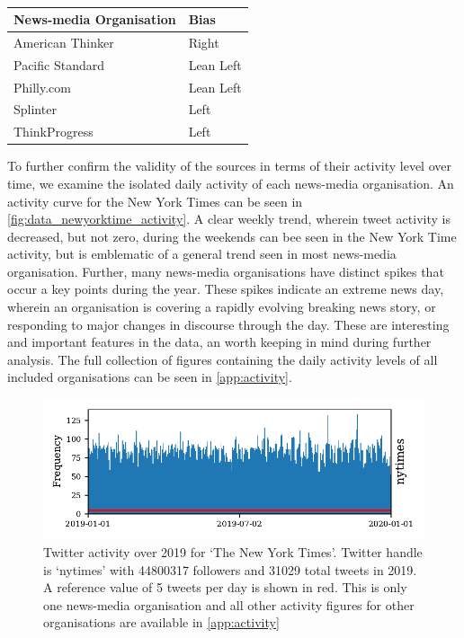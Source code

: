 \begin{table}
	\begin{tabular}{ll}
		\toprule
		News-media Organisation &    Bias \\
		\midrule
		American Thinker  &      Right \\
		Pacific Standard &  Lean Left \\
		Philly.com  &  Lean Left \\
		Splinter &       Left \\
		ThinkProgress  &       Left \\
		\bottomrule
	\end{tabular}
	\caption{\todo{}}
	\label{tab:data_removed_inactive_period}
\end{table}


To further confirm the validity of the sources in terms of their activity level over time, we examine the isolated daily activity of each news-media organisation. An activity curve for the New York Times can be seen in \autoref{fig:data_newyorktime_activity}. 
A clear weekly trend, wherein tweet activity is decreased, but not zero, during the weekends can bee seen in the New York Time activity, but is emblematic of a general trend seen in most news-media organisation. Further, many news-media organisations have distinct spikes that occur a key points during the year. These spikes indicate an extreme news day, wherein an organisation is covering a rapidly evolving breaking news story, or responding to major changes in discourse through the day. These are interesting and important features in the data, an worth keeping in mind during further analysis. The full collection of figures containing the daily activity levels of all included organisations can be seen in \autoref{app:activity}.

\begin{figure}
\centering
	\includegraphics{appendix2/figs/tweet_times/nytimes.pdf}
	\caption{Twitter activity over 2019 for `The New York Times'.
		Twitter handle is `nytimes' with 44800317 followers and 31029 total tweets in 2019. A reference value of 5 tweets per day is shown in red. This is only one news-media organisation and all other activity figures for other organisations are available in \autoref{app:activity}}
	\label{fig:data_newyorktime_activity}
\end{figure}

